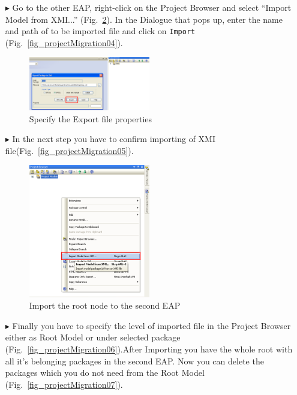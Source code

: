 \begin{enumerate}
\item[$\blacktriangleright$]Go to the other EAP, right-click on the Project
Browser and select ``Import Model from
XMI...'' (Fig.~\ref{fig_projectMigration03}). In the Dialogue that pops up, enter
the name and path of to be imported file and click on \texttt{Import} (Fig.~\ref{fig_projectMigration04}).

 \begin{figure}[htbp]
\begin{center}
  \includegraphics[width=0.5\textwidth]{pics/tricks/projectMigration/projectMigration2}
  \caption{Specify the Export file properties}  
  \label{fig_projectMigration02}
\end{center}
\end{figure}

\item[$\blacktriangleright$]In the next step you have to confirm importing of
XMI file(Fig.~\ref{fig_projectMigration05}).

\begin{figure}[htbp]
\begin{center}
  \includegraphics[width=0.5\textwidth]{pics/tricks/projectMigration/projectMigration3}
  \caption{Import the root node to the second EAP}  
  \label{fig_projectMigration03}
\end{center}
\end{figure}

\item[$\blacktriangleright$]Finally you have to specify the level of imported
file in the Project Browser either as Root Model or under selected
package (Fig.~\ref{fig_projectMigration06}).After Importing you have the whole root with all it's belonging
packages in the second EAP. Now you can delete the packages which you do not
need from the Root Model (Fig.~\ref{fig_projectMigration07}).


\end{enumerate}
